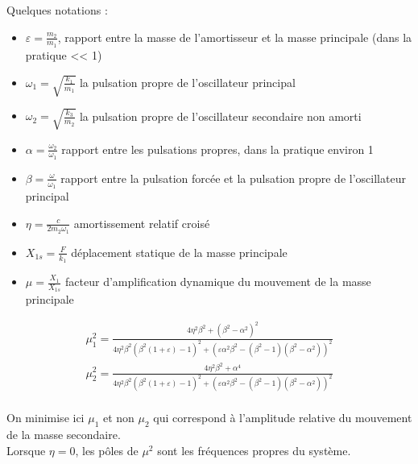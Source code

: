 \documentclass[../main.tex]{subfiles}
\begin{document}
Quelques notations : \begin{itemize}
    \item $\varepsilon = \frac{m_2}{m_1}$, rapport entre la masse de l'amortisseur et la masse principale (dans la pratique << 1)\\
    \item $\omega_1 = \sqrt{\frac{k_1}{m_1}}$ la pulsation propre de l'oscillateur principal\\
    \item $\omega_2 = \sqrt{\frac{k_3}{m_2}}$ la pulsation propre de l'oscillateur secondaire non amorti\\
    \item $\alpha = \frac{\omega_2}{\omega_1}$ rapport entre les pulsations propres, dans la pratique environ 1\\
    \item $\beta = \frac{\omega}{\omega_1}$ rapport entre la pulsation forcée et la pulsation propre de l'oscillateur principal\\
    \item $\eta = \frac{c}{2m_2 \omega_1}$ amortissement relatif croisé\\
    \item $X_{1s} = \frac{F}{k_1}$ déplacement statique de la masse principale\\
    \item $\mu = \frac{X_1}{X_{1s}}$ facteur d'amplification dynamique du mouvement de la masse principale\\
\end{itemize}


\begin{equation}\begin{gathered}
    \mu_1^2 = \frac{4\eta^2\beta^2 + (\beta^2-\alpha^2)^2}{4\eta^2\beta^2(\beta^2(1+\varepsilon)-1)^2+(\varepsilon \alpha^2\beta^2 - (\beta^2-1)(\beta^2-\alpha^2))^2}\\
    \mu_2^2 = \frac{4\eta^2\beta^2 + \alpha^4}{4\eta^2\beta^2(\beta^2(1+\varepsilon)-1)^2+(\varepsilon \alpha^2\beta^2 - (\beta^2-1)(\beta^2-\alpha^2))^2}\\
    \end{gathered}
\end{equation}

On minimise ici $\mu_1$ et non $\mu_2$ qui correspond à l'amplitude relative du mouvement de la masse secondaire.\\

\warning Lorsque $\eta = 0$, les pôles de $\mu^2$ sont les fréquences propres du système.\\
\end{document}
